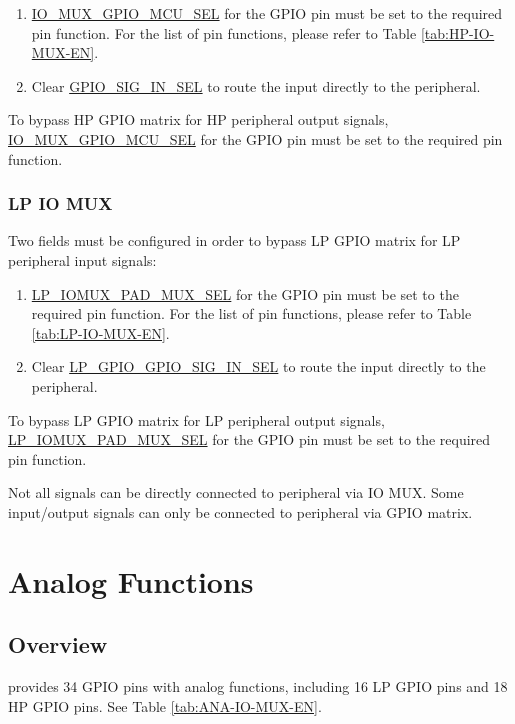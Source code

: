\documentclass[main\_\_EN.tex]{subfiles}
\begin{document}
\begin{enumerate}
\item \hyperref[fielddesc:IOMUXGPIONMCUSEL]{IO\_MUX\_GPIO\_MCU\_SEL} for the GPIO pin must be set to the required pin function. For the list of pin functions, please refer to Table \ref{tab:HP-IO-MUX-EN}.
\item Clear \hyperref[fielddesc:GPIOSIGNINSEL]{GPIO\_SIG\_IN\_SEL} to route the input directly to the peripheral.
\end{enumerate}

To bypass HP GPIO matrix for HP peripheral output signals, \hyperref[fielddesc:IOMUXGPIONMCUSEL]{IO\_MUX\_GPIO\_MCU\_SEL} for the GPIO pin must be set to the required pin function.

\subsubsection{LP IO MUX}
Two fields must be configured in order to bypass LP GPIO matrix for LP peripheral input signals:

\begin{enumerate}
\item \hyperref[fielddesc:LPIOMUXPADNMUXSEL] {LP\_IOMUX\_PAD\_MUX\_SEL} for the GPIO pin must be set to the required pin function. For the list of pin functions, please refer to Table \ref{tab:LP-IO-MUX-EN}.
\item Clear \hyperref[fielddesc:LPGPIOSIGNINSEL] {LP\_GPIO\_GPIO\_SIG\_IN\_SEL} to route the input directly to the peripheral.
\end{enumerate}

To bypass LP GPIO matrix for LP peripheral output signals, \hyperref[fielddesc:LPIOMUXPADNMUXSEL]{LP\_IOMUX\_PAD\_MUX\_SEL} for the GPIO pin must be set to the required pin function.
\begin{tiplisting}
Not all signals can be directly connected to peripheral via IO MUX. Some input/output signals can only be connected to peripheral via GPIO matrix.
\end{tiplisting}

\section{Analog Functions}

\subsection{Overview}
\chipname{} provides 34 GPIO pins with analog functions, including 16 LP GPIO pins and 18 HP GPIO pins. See Table \ref{tab:ANA-IO-MUX-EN}.
\end{document}

